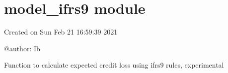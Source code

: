 \documentclass[letterpaper,10pt,english]{sphinxmanual}
\begin{document}
\sphinxstepscope


\section{model\_ifrs9 module}
\label{\detokenize{unsorted/model_ifrs9:module-model_ifrs9}}\label{\detokenize{unsorted/model_ifrs9:model-ifrs9-module}}\label{\detokenize{unsorted/model_ifrs9::doc}}
\sphinxAtStartPar
Created on Sun Feb 21 16:59:39 2021

\sphinxAtStartPar
@author: Ib

\sphinxAtStartPar
Function to calculate expected credit loss using ifrs9 rules, experimental
\end{document}

